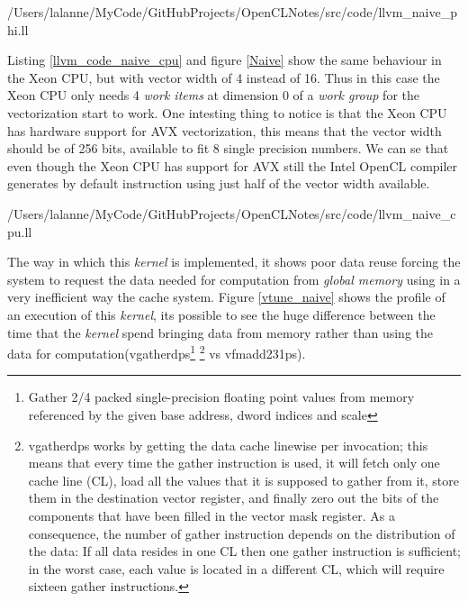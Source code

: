 
    {/Users/lalanne/MyCode/GitHubProjects/OpenCLNotes/src/code/llvm_naive_phi.ll}

\par{Listing \ref{llvm_code_naive_cpu} and figure \ref{Naive} show the same 
    behaviour in the Xeon CPU, but with vector width of 4 instead of 16. Thus 
    in this case the Xeon CPU only needs 4 \emph{work items} at dimension 0
    of a \emph{work group} for the vectorization start to work. One intesting
    thing to notice is that the Xeon CPU has hardware support for AVX 
    vectorization, this means that the vector width should be of 256 bits, 
    available to fit 8 single precision numbers. We can se that even though 
    the Xeon CPU has support for AVX still the Intel OpenCL compiler generates
    by default instruction using just half of the vector width available.}


    {/Users/lalanne/MyCode/GitHubProjects/OpenCLNotes/src/code/llvm_naive_cpu.ll}

\par{The way in which this \emph{kernel} is implemented, it shows poor data reuse
    forcing the system to request the data needed for computation from 
    \emph{global memory} using in a very inefficient way the cache system. 
    Figure \ref{vtune_naive} shows the profile of an execution of this \emph{
    kernel}, its possible to see the huge difference between the time that the
    \emph{kernel} spend bringing data from memory rather than using the data for
    computation(vgatherdps\footnote{Gather 2/4 packed 
    single-precision floating point values from memory referenced by the given 
    base address, dword indices and scale\cite{intrinsics}}
    \footnote{vgatherdps works by getting the data cache linewise per 
    invocation; this means that every time the gather instruction 
    is used, it will fetch only one cache line (CL), load all the values that 
    it is supposed to gather from it, store them in 
    the destination vector register, and finally zero out the bits of the 
    components that have been filled in the vector mask 
    register. As a consequence, the number of gather instruction depends on 
    the distribution of the data: 
    If all data resides in one CL then one gather instruction is sufficient; 
    in the worst case, each value is located in a different CL, 
    which will require sixteen gather instructions\cite{simd}.} vs vfmadd231ps).}

